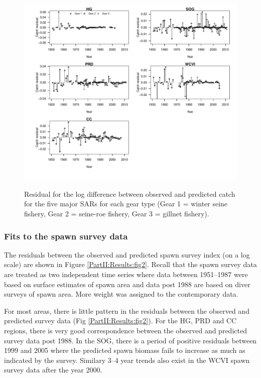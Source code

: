 \begin{figure}[!tbp]
	\includegraphics[width=\textwidth]{../FIGS/qPriorFigs/iscam_fig_catchresid.pdf}\\
	\caption{Residual for the log difference between observed and predicted catch for the five major SARs for each gear type (Gear 1 = winter seine fishery, Gear 2 = seine-roe fishery, Gear 3 = gillnet fishery).}\label{PartII:Results:fig1}
\end{figure}


\subsubsection{Fits to the spawn survey data}
The residuals between the observed and predicted spawn survey index (on a log scale) are shown in Figure \ref{PartII:Results:fig2}.  Recall that the spawn survey data are treated as two independent time series where data between 1951--1987 were based on surface estimates of spawn area and data post 1988 are based on diver surveys of spawn area.  More weight was assigned to the contemporary data.   

For most areas, there is little pattern in the residuals between the observed and predicted survey data (Fig \ref{PartII:Results:fig2}).  For the HG, PRD and CC regions, there is very good correspondence between the observed and predicted survey data post 1988.  In the SOG, there is a period of positive residuals between 1999 and 2005 where the predicted spawn biomass fails to increase as much as indicated by the survey.  Similary 3--4 year trends also exist in the WCVI spawn survey data after the year 2000.

